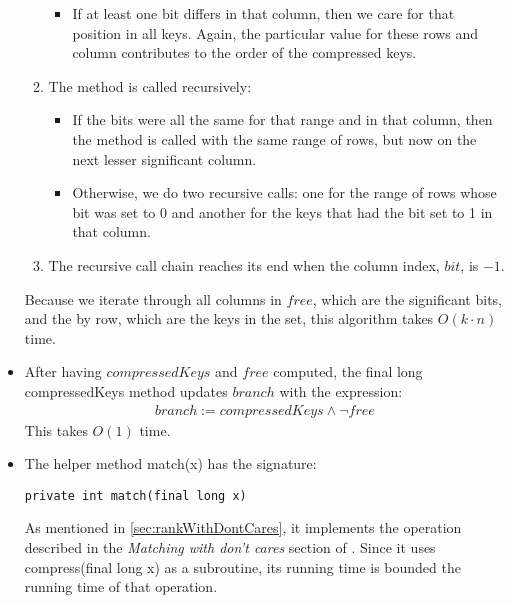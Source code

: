 \begin{itemize}
\begin{enumerate}
\begin{itemize}
            \item
            If at least one bit differs in that column, then we care for that position in all keys. Again, the particular value for these rows and column contributes to the order of the compressed keys.
        \end{itemize}
        
        \item
        The method is called recursively:
        \begin{itemize}
            \item
            If the bits were all the same for that range and in that column, then the method is called with the same range of rows, but now on the next lesser significant column.
            
            \item
            Otherwise, we do two recursive calls: one for the range of rows whose bit was set to 0 and another for the keys that had the bit set to 1 in that column.
        \end{itemize}
        
        \item
        The recursive call chain reaches its end when the column index, $bit$, is $-1$.
    \end{enumerate}
    Because we iterate through all columns in $free$, which are the significant bits, and the by row, which are the keys in the set, this algorithm takes $O(k \cdot n)$ time.
    
    \item
    After having $compressedKeys$ and $free$ computed, the {\ttfamily final long compressedKeys} method updates $branch$ with the expression:
    \begin{align*}
        branch := compressedKeys \wedge \neg free
    \end{align*}
    This takes $O(1)$ time.
    
    \item
    The helper method {\ttfamily match(x)} has the signature:
    \begin{lstlisting}
private int match(final long x)
    \end{lstlisting}
    As mentioned in \ref{sec:rankWithDontCares}, it implements the operation described in the \textit{Matching with don't cares} section of \cite{patrascu2014dynamic}.
    Since it uses {\ttfamily compress(final long x)} as a subroutine, its running time is bounded the running time of that operation.
    

\end{itemize}
